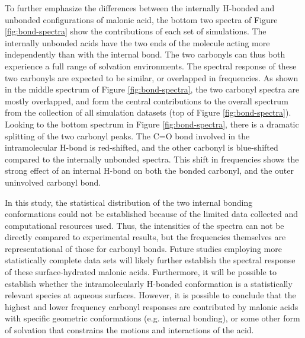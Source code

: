 To further emphasize the differences between the internally H-bonded and unbonded configurations of malonic acid, the bottom two spectra of Figure \ref{fig:bond-spectra} show the contributions of each set of simulations. The internally unbonded acids have the two ends of the molecule acting more independently than with the internal bond. The two carbonyls can thus both experience a full range of solvation environments. The spectral response of these two carbonyls are expected to be similar, or overlapped in frequencies. As shown in the middle spectrum of Figure \ref{fig:bond-spectra}, the two carbonyl spectra are mostly overlapped, and form the central contributions to the overall spectrum from the collection of all simulation datasets (top of Figure \ref{fig:bond-spectra}). Looking to the bottom spectrum in Figure \ref{fig:bond-spectra}, there is a dramatic splitting of the two carbonyl peaks. The C=O bond involved in the intramolecular H-bond is red-shifted, and the other carbonyl is blue-shifted compared to the internally unbonded spectra. This shift in frequencies shows the strong effect of an internal H-bond on both the bonded carbonyl, and the outer uninvolved carbonyl bond.

In this study, the statistical distribution of the two internal bonding conformations could not be established because of the limited data collected and computational resources used. Thus, the intensities of the spectra can not be directly compared to experimental results, but the frequencies themselves are representational of those for carbonyl bonds. Future studies employing more statistically complete data sets will likely further establish the spectral response of these surface-hydrated malonic acids. Furthermore, it will be possible to establish whether the intramolecularly H-bonded conformation is a statistically relevant species at aqueous surfaces. However, it is possible to conclude that the highest and lower frequency carbonyl responses are contributed by malonic acids with specific geometric conformations (e.g. internal bonding), or some other form of solvation that constrains the motions and interactions of the acid.
